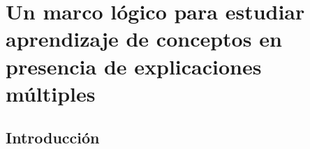 

\chapter{Un marco lógico para estudiar aprendizaje de conceptos en presencia de explicaciones múltiples}\label{chapter:BRM}




\section{Introducción}




